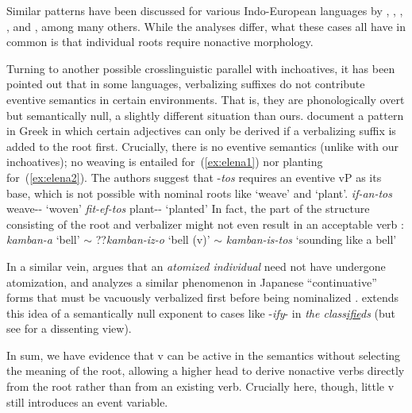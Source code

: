 Similar patterns have been discussed for various Indo-European languages by \cite{aronoff94}, \cite{embick04}, \cite{kallulli13}, \cite{wood15springer}, \cite{kastnerzu17} and \cite{grestenberger18}, among many others. While the analyses differ, what these cases all have in common is that individual roots require nonactive morphology.

Turning to another possible crosslinguistic parallel with inchoatives, it has been pointed out that in some languages, verbalizing suffixes do not contribute eventive semantics in certain environments. That is, they are phonologically overt but semantically null, a slightly different situation than ours. \citet{elenasamioti13,elenasamioti14} document a pattern in Greek in which certain adjectives can only be derived if a verbalizing suffix is added to the root first. Crucially, there is no eventive semantics (unlike with our inchoatives); no weaving is entailed for~(\ref{ex:elena1}) nor planting for~(\ref{ex:elena2}). {The authors suggest that -\emph{tos} requires an eventive vP as its base, which is not possible with nominal roots like `weave' and `plant'.}
\ex \label{ex:elena1} \emph{if-an-tos} weave-- `woven'
\xe
\ex \label{ex:elena2} \emph{fit-ef-tos} plant-- `planted' \hfill \citep[97]{elenasamioti14}
\xe
In fact, the part of the structure consisting of the root and verbalizer might not even result in an acceptable verb \citep[100]{elenasamioti14}:
\ex \emph{kamban-a} `bell' $\sim$ ??\emph{kamban-iz-o} `bell (v)' $\sim$ \emph{kamban-is-tos} `sounding like a bell'
\xe

In a similar vein, \cite{marantz13} argues that an \emph{atomized individual} need not have undergone atomization, and analyzes a similar phenomenon in Japanese ``continuative'' forms that must be vacuously verbalized first{ before being nominalized} \citep{volpe05}. \cite{anagnostopoulou14thli} extends this idea of a semantically null exponent to cases like -\emph{ify}- in \emph{the class\underline{ifie}ds} (but see \citealt{borer14lingua} for a dissenting view).

In sum, we have evidence that v can be active in the semantics without selecting the meaning of the root, allowing a higher {\vz} head to derive nonactive verbs directly from the root rather than from an existing verb. Crucially here, though, little v still introduces an event variable.

